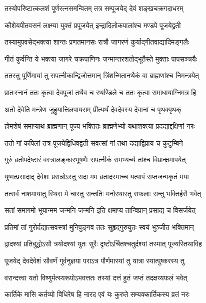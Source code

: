 \twolineshloka
{तस्योपरिष्टात्कलशं पूर्णरत्नसमन्वितम्}
{तत्र सम्पूजयेद् देवं शङ्खचक्रगदाधरम्} %

\twolineshloka
{कौशेयपीतवसनं लक्ष्म्या युक्तं प्रपूजयेत्}
{इन्द्रादिलोकपालांश्च मण्डपे पूजयेद्व्रती} %

\twolineshloka
{तस्यामुपवसेद्भक्त्या शान्तः प्रणतमानसः}
{रात्रौ जागरणं कुर्याद्गीतवाद्यादिमङ्गलैः} %

\twolineshloka
{गीतं कुर्वन्ति ये भक्त्या जागरे चक्रपाणिनः}
{जन्मान्तरशतोद्भूतैस्ते मुक्ताः पापसञ्चयैः} %

\twolineshloka
{ततस्तु पूर्णिमायां तु सपत्नीकान्द्विजोत्तमान्}
{त्रिंशन्मितानथैकं वा ब्राह्मणांश्च निमन्त्रयेत्} %

\twolineshloka
{प्रातःस्नानं ततः कृत्वा देवपूजां तथैव च}
{स्थण्डिले च ततः कृत्वा समाधायाग्निमत्र हि} %

\twolineshloka
{अतो देवेति मन्त्रेण जुहुयात्तिलपायसम्}
{प्रीत्यर्थं देवदेवस्य देवानां च पृथक्पृथक्} %

\twolineshloka
{होमशेषं समाप्याथ ब्राह्मणान् पूज्य भक्तितः}
{ब्राह्मणेभ्यो यथाशक्त्या प्रदद्याद्दक्षिणां नरः} %

\twolineshloka
{ततो गां कपिलां तत्र पूजयेद्विधिवद्व्रती}
{सवत्सां गां तथा दद्याद्विप्राय च कुटुम्बिने} %

\twolineshloka
{गुरुं व्रतोपदेष्टारं वस्त्रालङ्कारभूषणैः}
{सपत्नीकं समभ्यर्च्य तांश्च विप्रान्क्षमापयेत्} %

\twolineshloka
{युष्मत्प्रसादाद् देवेशः प्रसन्नोऽस्तु सदा मम}
{व्रतादस्माच्च यत्पापं सप्तजन्मकृतं मया} %

\twolineshloka
{तत्सर्वं नाशमायातु स्थिरा मे चास्तु सन्ततिः}
{मनोरथास्तु सफलाः सन्तु भक्तिर्हरौ भवेत्} %

\twolineshloka
{सतां समागमो भूयान्मम जन्मनि जन्मनि}
{इति क्षमाप्य तान्विप्रान् प्रसाद्य च विसर्जयेत्} %

\twolineshloka
{प्रतिमां तां गुरोर्दद्यात्सवस्त्रां मुनिपुङ्गव}
{ततः सुहृद्गुरुयुतः स्वयं भुञ्जीत भक्तिमान्} %

\twolineshloka
{द्वादश्यां प्रतिबुद्धोऽसौ त्रयोदश्यां युतः सुरैः}
{दृष्टोऽर्चितश्चतुर्दश्यां तस्मात् पूज्यस्तिथाविह} %

\twolineshloka
{पूजयेद् देवदेवेशं सौवर्णं गुर्वनुज्ञया}
{पराऽत्र पौर्णमास्यां तु यात्रा स्यात्पुष्करस्य तु} %

\twolineshloka
{वरान्दत्त्वा यतो विष्णुर्मत्स्यरूपोऽभवत्ततः}
{तस्यां दत्तं हुतं जप्तं तदक्षय्यफलं भवेत्} %

\twolineshloka
{कार्तिके मासि कर्तव्यो विधिरेष हि नारद}
{एवं यः कुरुते सम्यक्कार्तिकस्य व्रतं नरः} %

